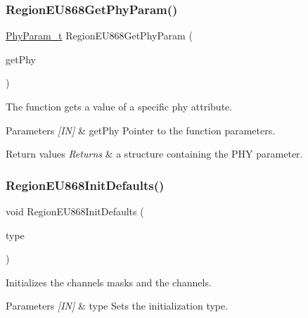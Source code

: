 \subsubsection{\texorpdfstring{Region\+E\+U868\+Get\+Phy\+Param()}{RegionEU868GetPhyParam()}}
{\footnotesize\ttfamily \hyperlink{group__REGION_gaed159b26e5c4677236b6e8677019db30}{Phy\+Param\+\_\+t} Region\+E\+U868\+Get\+Phy\+Param (\begin{DoxyParamCaption}\item[{\hyperlink{group__REGION_gab471483fff904f4f89bbc03f7fc380ab}{Get\+Phy\+Params\+\_\+t} $\ast$}]{get\+Phy }\end{DoxyParamCaption})}



The function gets a value of a specific phy attribute. 


\begin{DoxyParams}{Parameters}
{\em \mbox{[}\+I\+N\mbox{]}} & get\+Phy Pointer to the function parameters.\\
\hline
\end{DoxyParams}

\begin{DoxyRetVals}{Return values}
{\em Returns} & a structure containing the P\+HY parameter. \\
\hline
\end{DoxyRetVals}
\mbox{\label{group__REGIONEU868_ga3e8ada4579aff33ad74ca34513d64893}} 
\subsubsection{\texorpdfstring{Region\+E\+U868\+Init\+Defaults()}{RegionEU868InitDefaults()}}
{\footnotesize\ttfamily void Region\+E\+U868\+Init\+Defaults (\begin{DoxyParamCaption}\item[{\hyperlink{group__REGION_gaddc73ae10673ec925724e7870363bda9}{Init\+Type\+\_\+t}}]{type }\end{DoxyParamCaption})}



Initializes the channels masks and the channels. 


\begin{DoxyParams}{Parameters}
{\em \mbox{[}\+I\+N\mbox{]}} & type Sets the initialization type. \\
\hline
\end{DoxyParams}
\mbox{\label{group__REGIONEU868_gace7b25487170fb5d862413fc221f95db}} 
